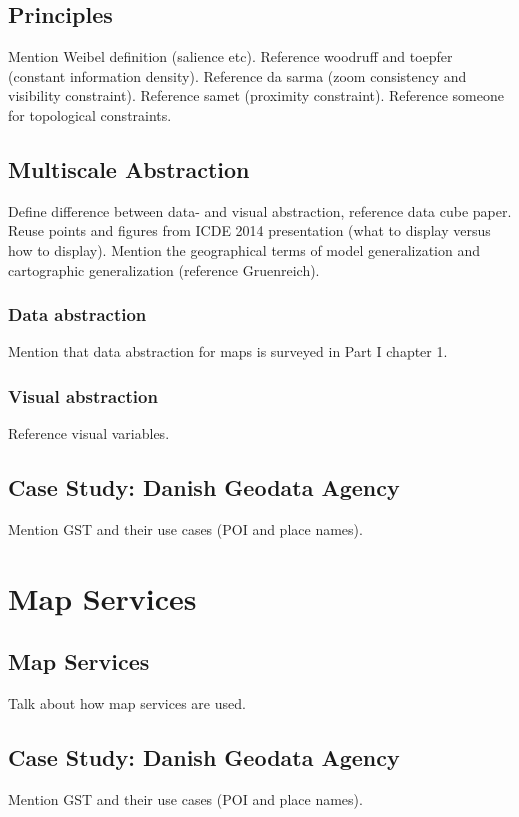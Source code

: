 \documentclass[11pt, oneside]{report}   	%
\begin{document}
\section{Principles}
Mention Weibel definition (salience etc). Reference woodruff and toepfer (constant information density). Reference da sarma (zoom consistency and visibility constraint). Reference samet (proximity constraint). Reference someone for topological constraints.

\section{Multiscale Abstraction}
Define difference between data- and visual abstraction, reference data cube paper. Reuse points and figures from ICDE 2014 presentation (what to display versus how to display). Mention the geographical terms of model generalization and cartographic generalization (reference Gruenreich). 

\subsection{Data abstraction}
Mention that data abstraction for maps is surveyed in Part I chapter 1.

\subsubsection{}

\subsection{Visual abstraction}
Reference visual variables.

\section{Case Study: Danish Geodata Agency}
Mention GST and their use cases (POI and place names).

\chapter{Map Services}

\section{Map Services}
Talk about how map services are used.

\section{Case Study: Danish Geodata Agency}
Mention GST and their use cases (POI and place names).
\end{document}
